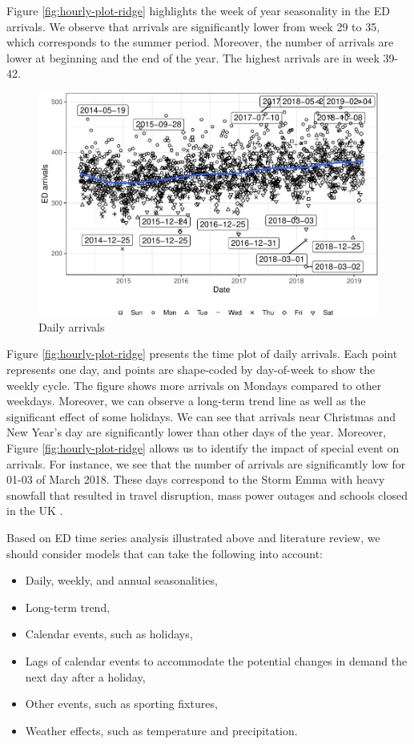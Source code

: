 \documentclass[]{elsarticle} %
\begin{document}
Figure \ref{fig:hourly-plot-ridge} highlights the week of year seasonality in the ED arrivals. We observe that arrivals are significantly lower from week 29 to 35, which corresponds to the summer period. Moreover, the number of arrivals are lower at beginning and the end of the year. The highest arrivals are in week 39-42.

\begin{figure}[H]

{\centering \includegraphics[width=0.7\linewidth]{paper_files/figure-latex/date-plot-1} 

}

\caption{Daily arrivals}\label{fig:date-plot}
\end{figure}

Figure \ref{fig:hourly-plot-ridge} presents the time plot of daily arrivals. Each point represents one day, and points are shape-coded by day-of-week to show the weekly cycle. The figure shows more arrivals on Mondays compared to other weekdays. Moreover, we can observe a long-term trend line as well as the significant effect of some holidays. We can see that arrivals near Christmas and New Year's day are significantly lower than other days of the year. Moreover, Figure \ref{fig:hourly-plot-ridge} allows us to identify the impact of special event on arrivals. For instance, we see that the number of arrivals are significamtly low for 01-03 of March 2018. These days correspond to the Storm Emma with heavy snowfall that resulted in travel disruption, mass power outages and schools closed in the UK \citep{stormemma2018}.

Based on ED time series analysis illustrated above and literature review, we should consider models that can take the following into account:

\begin{itemize}
\item
  Daily, weekly, and annual seasonalities,
\item
  Long-term trend,
\item
  Calendar events, such as holidays,
\item
  Lags of calendar events to accommodate the potential changes in demand the next day after a holiday,
\item
  Other events, such as sporting fixtures,
\item
  Weather effects, such as temperature and precipitation.
\end{itemize}
\end{document}
